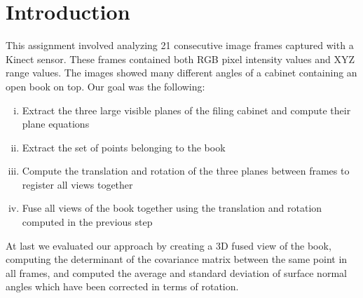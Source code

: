 \section{Introduction}
This assignment involved analyzing 21 consecutive image frames captured with a Kinect sensor. These frames contained both RGB pixel intensity values and XYZ range values. The images showed many different angles of a cabinet containing an open book on top. Our goal was the following:
\begin{enumerate}[(i)]
	\item Extract the three large visible planes of the filing cabinet and compute their plane equations
	\item Extract the set of points belonging to the book
	\item Compute the translation and rotation of the three planes between frames to register all views together
	\item Fuse all views of the book together using the translation and rotation computed in the previous step
\end{enumerate}
At last we evaluated our approach by creating a 3D fused view of the book, computing the determinant of the covariance matrix between the same point in all frames, and computed the average and standard deviation of surface normal angles which have been corrected in terms of rotation.